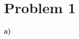\documentclass{article}
\begin{document}


\section*{\textbf{Problem 1}}
\vspace*{12pt}\small\textbf{a)}
\end{document}

